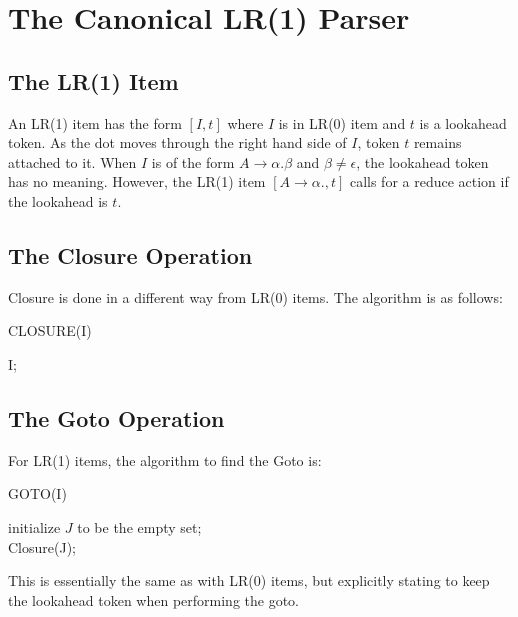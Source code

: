 \documentclass[12pt,letterpaper]{book}
\theoremstyle{definition}
\begin{document}
\section{The Canonical LR(1) Parser}

\subsection{The LR(1) Item}

An LR(1) item has the form $[I,t]$ where $I$ is in LR(0) item and $t$ is a lookahead token. As the dot moves through the right hand side of $I$, token $t$ remains attached to it. When $I$ is of the form $A \rightarrow \alpha . \beta$ and $\beta \neq \epsilon$, the lookahead token has no meaning. However, the LR(1) item $[A \rightarrow \alpha ., t]$ calls for a reduce action if the lookahead is $t$.

\subsection{The Closure Operation}

Closure is done in a different way from LR(0) items. The algorithm is as follows:

\begin{algorithm}[H]
  \SetAlgoLined
  \caption{CLOSURE(I)}
   {
  }
  \Return I;
\end{algorithm}

\subsection{The Goto Operation}

For LR(1) items, the algorithm to find the Goto is:

\begin{algorithm}[H]
  \SetAlgoLined
  \caption{GOTO(I)}
  initialize $J$ to be the empty set; \\
  \Return Closure(J);
\end{algorithm}

This is essentially the same as with LR(0) items, but explicitly stating to keep the lookahead token when performing the goto.
\end{document}
